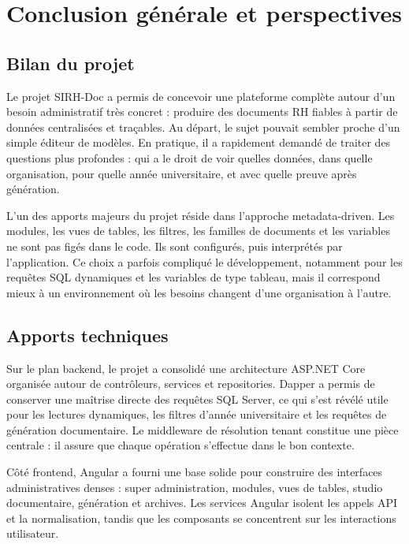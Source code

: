 \chapter{Conclusion générale et perspectives}

\section{Bilan du projet}

Le projet SIRH-Doc a permis de concevoir une plateforme complète autour d'un besoin administratif très concret : produire des documents RH fiables à partir de données centralisées et traçables. Au départ, le sujet pouvait sembler proche d'un simple éditeur de modèles. En pratique, il a rapidement demandé de traiter des questions plus profondes : qui a le droit de voir quelles données, dans quelle organisation, pour quelle année universitaire, et avec quelle preuve après génération.

L'un des apports majeurs du projet réside dans l'approche metadata-driven. Les modules, les vues de tables, les filtres, les familles de documents et les variables ne sont pas figés dans le code. Ils sont configurés, puis interprétés par l'application. Ce choix a parfois compliqué le développement, notamment pour les requêtes SQL dynamiques et les variables de type tableau, mais il correspond mieux à un environnement où les besoins changent d'une organisation à l'autre.

\section{Apports techniques}

Sur le plan backend, le projet a consolidé une architecture ASP.NET Core organisée autour de contrôleurs, services et repositories. Dapper a permis de conserver une maîtrise directe des requêtes SQL Server, ce qui s'est révélé utile pour les lectures dynamiques, les filtres d'année universitaire et les requêtes de génération documentaire. Le middleware de résolution tenant constitue une pièce centrale : il assure que chaque opération s'effectue dans le bon contexte.

Côté frontend, Angular a fourni une base solide pour construire des interfaces administratives denses : super administration, modules, vues de tables, studio documentaire, génération et archives. Les services Angular isolent les appels API et la normalisation, tandis que les composants se concentrent sur les interactions utilisateur.

